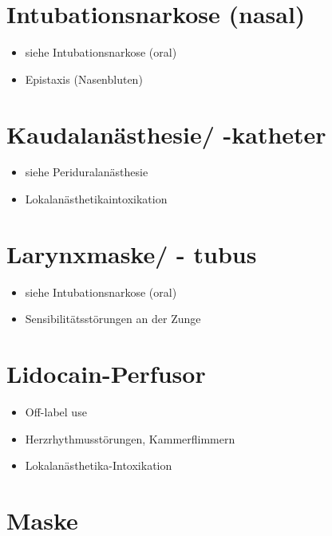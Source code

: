 \documentclass[
]{book}
\providecommand{\tightlist}{%
  \setlength{\itemsep}{0pt}\setlength{\parskip}{0pt}}
\begin{document}
\hypertarget{intubationsnarkose-nasal}{%
\section{Intubationsnarkose (nasal)}\label{intubationsnarkose-nasal}}

\begin{itemize}
\tightlist
\item
  siehe Intubationsnarkose (oral)
\item
  Epistaxis (Nasenbluten)
\end{itemize}

\hypertarget{kaudalanuxe4sthesie--katheter}{%
\section{Kaudalanästhesie/ -katheter}\label{kaudalanuxe4sthesie--katheter}}

\begin{itemize}
\tightlist
\item
  siehe Periduralanästhesie
\item
  Lokalanästhetikaintoxikation
\end{itemize}

\hypertarget{larynxmaske---tubus}{%
\section{Larynxmaske/ - tubus}\label{larynxmaske---tubus}}

\begin{itemize}
\tightlist
\item
  siehe Intubationsnarkose (oral)
\item
  Sensibilitätsstörungen an der Zunge
\end{itemize}

\hypertarget{lidocain-perfusor}{%
\section{Lidocain-Perfusor}\label{lidocain-perfusor}}

\begin{itemize}
\tightlist
\item
  Off-label use
\item
  Herzrhythmusstörungen, Kammerflimmern
\item
  Lokalanästhetika-Intoxikation
\end{itemize}

\hypertarget{maske}{%
\section{Maske}\label{maske}}
\end{document}
